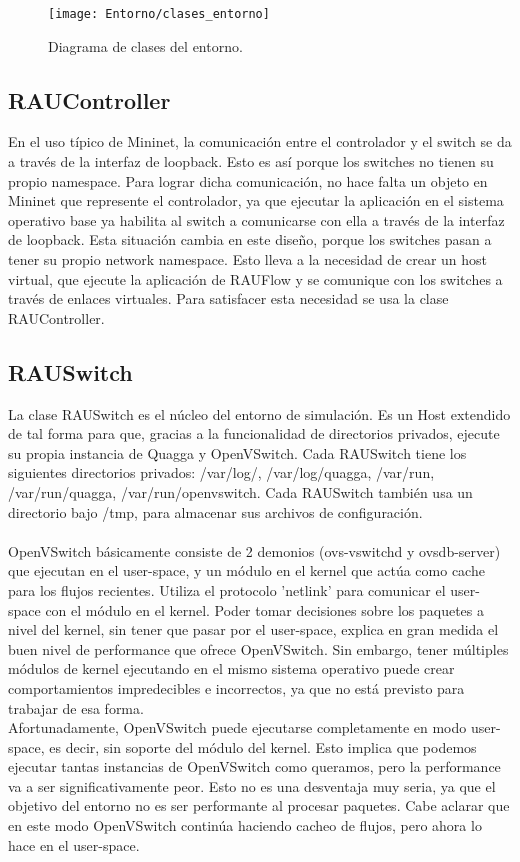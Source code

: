 \begin{figure}[t]
	\caption{Diagrama de clases del entorno.}
	\texttt{[image: Entorno/clases\_entorno]}
	\centering
	\label{fig:clases_entorno}
\end{figure}

\subsection{RAUController}
En el uso típico de Mininet, la comunicación entre el controlador y el switch se da a través de la interfaz de loopback. Esto es así porque los switches no tienen su propio namespace. Para lograr dicha comunicación, no hace falta un objeto en Mininet que represente el controlador, ya que ejecutar la aplicación en el sistema operativo base ya habilita al switch a comunicarse con ella a través de la interfaz de loopback. Esta situación cambia en este diseño, porque los switches pasan a tener su propio network namespace. Esto lleva a la necesidad de crear un host virtual, que ejecute la aplicación de RAUFlow y se comunique con los switches a través de enlaces virtuales. Para satisfacer esta necesidad se usa la clase RAUController.

\subsection{RAUSwitch}
La clase RAUSwitch es el núcleo del entorno de simulación. Es un Host extendido de tal forma para que, gracias a la funcionalidad de directorios privados, ejecute su propia instancia de Quagga y OpenVSwitch. Cada RAUSwitch tiene los siguientes directorios privados: /var/log/, /var/log/quagga, /var/run, /var/run/quagga, /var/run/openvswitch. Cada RAUSwitch también usa un directorio bajo /tmp, para almacenar sus archivos de configuración.\\ \\

OpenVSwitch básicamente consiste de 2 demonios (ovs-vswitchd y ovsdb-server) que ejecutan en el user-space, y un módulo en el kernel que actúa como cache para los flujos recientes. Utiliza el protocolo 'netlink' para comunicar el user-space con el módulo en el kernel. Poder tomar decisiones sobre los paquetes a nivel del kernel, sin tener que pasar por el user-space, explica en gran medida el buen nivel de performance que ofrece OpenVSwitch. Sin embargo, tener múltiples módulos de kernel ejecutando en el mismo sistema operativo puede crear comportamientos impredecibles e incorrectos, ya que no está previsto para trabajar de esa forma.\\
Afortunadamente, OpenVSwitch puede ejecutarse completamente en modo user-space, es decir, sin soporte del módulo del kernel. Esto implica que podemos ejecutar tantas instancias de OpenVSwitch como queramos, pero la performance va a ser significativamente peor. Esto no es una desventaja muy seria, ya que el objetivo del entorno no es ser performante al procesar paquetes. Cabe aclarar que en este modo OpenVSwitch continúa haciendo cacheo de flujos, pero ahora lo hace en el user-space.

